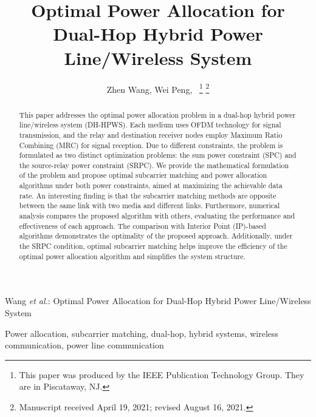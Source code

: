 \documentclass[lettersize,journal]{IEEEtran}
\begin{document}
	
	\title{Optimal Power Allocation for Dual-Hop Hybrid Power Line/Wireless System}
	
	\author{Zhen Wang, Wei Peng,~
		\thanks{This paper was produced by the IEEE Publication Technology Group. They are in Piscataway, NJ.}%
		\thanks{Manuscript received April 19, 2021; revised August 16, 2021.}}
	
	{Wang \MakeLowercase{\textit{et al.}}: Optimal Power Allocation for Dual-Hop Hybrid Power Line/Wireless System}
	
	
	\maketitle
	
	\begin{abstract}
		This paper addresses the optimal power allocation problem in a dual-hop hybrid power line/wireless system (DH-HPWS). Each medium uses OFDM technology for signal transmission, and the relay and destination receiver nodes employ Maximum Ratio Combining (MRC) for signal reception. Due to different constraints, the problem is formulated as two distinct optimization problems: the sum power constraint (SPC) and the source-relay power constraint (SRPC). We provide the mathematical formulation of the problem and propose optimal subcarrier matching and power allocation algorithms under both power constraints, aimed at maximizing the achievable data rate. An interesting finding is that the subcarrier matching methods are opposite between the same link with two media and different links. Furthermore, numerical analysis compares the proposed algorithm with others, evaluating the performance and effectiveness of each approach. The comparison with Interior Point (IP)-based algorithms demonstrates the optimality of the proposed approach. Additionally, under the SRPC condition, optimal subcarrier matching helps improve the efficiency of the optimal power allocation algorithm and simplifies the system structure.
	\end{abstract}
	
	\begin{IEEEkeywords}
		Power allocation, subcarrier matching, dual-hop, hybrid systems, wireless communication, power line communication
	\end{IEEEkeywords}
	
\end{document}
